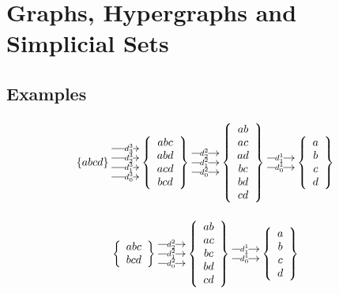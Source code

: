 \documentclass[10pt]{article}
\theoremstyle{remark}
\begin{document}
\section{Graphs, Hypergraphs and Simplicial Sets}

\subsection{Examples}

$$
\xymatrix{
\{abcd\} \ar@<3ex>[r]|{d_3^3}  \ar@<1 ex>[r]|{d_2^3}  \ar@<-1ex>[r]|{d_1^3}  \ar@<-3 ex>[r]|{d_0^3} &
     \left\{ {\begin{array}{c} abc \\ abd \\ acd \\ bcd \end{array}} \right\} \ar@<2ex>[r]|{d_2^2}  \ar[r]|{d_1^2} \ar@<-2 ex>[r]|{d_0^2} &
     \left\{ {\begin{array}{c} ab \\ ac \\ ad \\ bc \\ bd \\ cd \end{array}} \right\} \ar@<1ex>[r]|{d_1^1} \ar@<-1ex>[r]|{d_0^1} &
     \left\{ {\begin{array}{c} a \\ b \\ c \\ d \end{array}} \right\}
}
$$

$$
\xymatrix{
     \left\{ {\begin{array}{c} abc \\ bcd \end{array}} \right\} \ar@<2ex>[r]|{d_2^2}  \ar[r]|{d_1^2} \ar@<-2 ex>[r]|{d_0^2} &
     \left\{ {\begin{array}{c} ab \\ ac \\ bc \\ bd \\ cd \end{array}} \right\} \ar@<1ex>[r]|{d_1^1} \ar@<-1ex>[r]|{d_0^1} &
     \left\{ {\begin{array}{c} a \\ b \\ c \\ d \end{array}} \right\}
}
$$
\end{document}
